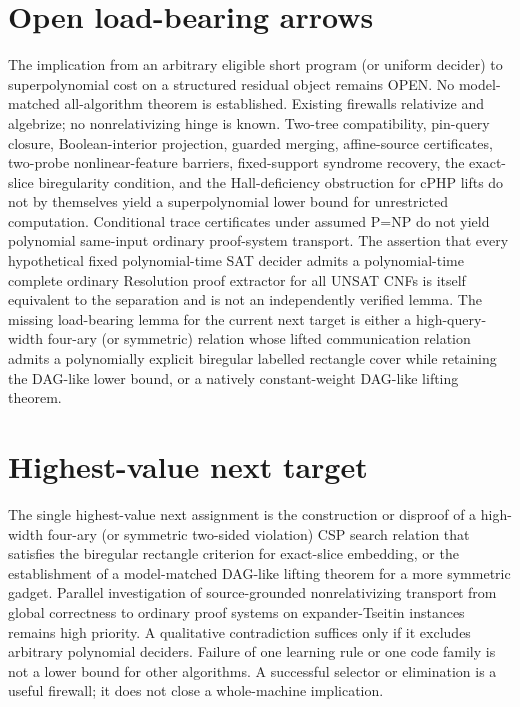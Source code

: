 \documentclass[11pt]{article}
\begin{document}
\section{Open load-bearing arrows}
The implication from an arbitrary eligible short program (or uniform decider) to superpolynomial cost on a structured residual object remains OPEN. No model-matched all-algorithm theorem is established. Existing firewalls relativize and algebrize; no nonrelativizing hinge is known. Two-tree compatibility, pin-query closure, Boolean-interior projection, guarded merging, affine-source certificates, two-probe nonlinear-feature barriers, fixed-support syndrome recovery, the exact-slice biregularity condition, and the Hall-deficiency obstruction for cPHP lifts do not by themselves yield a superpolynomial lower bound for unrestricted computation. Conditional trace certificates under assumed P=NP do not yield polynomial same-input ordinary proof-system transport. The assertion that every hypothetical fixed polynomial-time SAT decider admits a polynomial-time complete ordinary Resolution proof extractor for all UNSAT CNFs is itself equivalent to the separation and is not an independently verified lemma. The missing load-bearing lemma for the current next target is either a high-query-width four-ary (or symmetric) relation whose lifted communication relation admits a polynomially explicit biregular labelled rectangle cover while retaining the DAG-like lower bound, or a natively constant-weight DAG-like lifting theorem.

\section{Highest-value next target}
The single highest-value next assignment is the construction or disproof of a high-width four-ary (or symmetric two-sided violation) CSP search relation that satisfies the biregular rectangle criterion for exact-slice embedding, or the establishment of a model-matched DAG-like lifting theorem for a more symmetric gadget. Parallel investigation of source-grounded nonrelativizing transport from global correctness to ordinary proof systems on expander-Tseitin instances remains high priority. A qualitative contradiction suffices only if it excludes arbitrary polynomial deciders. Failure of one learning rule or one code family is not a lower bound for other algorithms. A successful selector or elimination is a useful firewall; it does not close a whole-machine implication.
\end{document}
